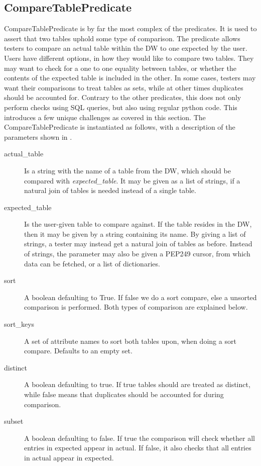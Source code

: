 \subsection{CompareTablePredicate}
CompareTablePredicate is by far the most complex of the predicates. It is used to assert that two tables uphold some type of comparison. The predicate allows testers to compare an actual table within the DW to one expected by the user. Users have different options, in how they would like to compare two tables. They may want to check for a one to one equality between tables, or whether the contents of the expected table is included in the other. In some cases, testers may want their comparisons to treat tables as sets, while at other times duplicates should be accounted for. Contrary to the other predicates, this does not only perform checks using SQL queries, but also using regular python code. This introduces a few unique challenges as covered in this section. The CompareTablePredicate is instantiated as follows, with a description of the parameters shown in .


\begin{description}
\item [actual\_table] Is a string with the name of a table from the DW, which should be compared with \textit{expected\_table}. It may be given as a list of strings, if a natural join of tables is needed instead of a single table.
\item [expected\_table] Is the user-given table to compare against. If the table resides in the DW, then it may be given by a string containing its name. By giving a list of strings, a tester may instead get a natural join of tables as before. Instead of strings, the parameter may also be given a PEP249 cursor, from which data can be fetched, or a list of dictionaries.
\item [sort] A boolean defaulting to True. If false we do a sort compare, else a unsorted comparison is performed. Both types of comparison are explained below.
\item [sort\_keys] A set of attribute names to sort both tables upon, when doing a sort compare. Defaults to an empty set.
\item [distinct] A boolean defaulting to true. If true tables should are treated as distinct, while false means that duplicates should be accounted for during comparison.
\item [subset] A boolean defaulting to false. If true the comparison will check whether all entries in expected appear in actual. If false, it also checks that all entries in actual appear in expected.
\end{description}

